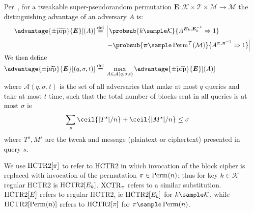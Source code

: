 \documentclass[hctr.tex]{subfiles}
\begin{document}
Per~\cite{cmc}, for a tweakable super-pseudorandom permutation
$\bm{E} : \mathcal{K} \times \mathcal{T} \times \mathcal{M} \rightarrow \mathcal{M}$
the distinguishing advantage of an adversary $A$ is:
%
\begin{align*}
    \advantage{\pm \widetilde{\mathrm{prp}}}{\bm{E}}[(A)] \defeq
    {}&\left\lvert\probsub{k \sample \mathcal{K}}{A^{\bm{E}_k,\bm{E}_k^{-1}}\Rightarrow 1}\right.
    \\
    {}&\left. - \probsub{\bm{\pi} \sample \Perm^\mathcal{T}(\mathcal{M})}
        {A^{\bm{\pi},\bm{\pi}^{-1}}\Rightarrow 1}\right\rvert
    \\
    \intertext{We then define}
    \advantage{\pm \widetilde{\mathrm{prp}}}{\bm{E}}[(q, \sigma, t)]
    \defeq {}&
    \max_{A \in \mathcal{A}(q, \sigma, t)} \advantage{\pm \widetilde{\mathrm{prp}}}{\bm{E}}[(A)]
\end{align*}
where \(\mathcal{A}(q, \sigma, t)\)
is the set of all adversaries 
that make at most \(q\) queries
and take at most \(t\) time,
such that the total number of blocks sent in all queries is
at most \(\sigma\) ie
\begin{displaymath}
    \sum_s \ceil{|T^s|/n} + \ceil{|M^s|/n} \leq \sigma
\end{displaymath}
where \(T^s, M^s\) are the tweak and message
(plaintext or ciphertext)
presented in query \(s\).

We use \(\operatorname{HCTR2}[\pi]\) to refer to HCTR2 in which invocation
of the block cipher is replaced with invocation of the
permutation \(\pi \in \operatorname{Perm}(n)\); thus for key
\(k \in \mathcal{K}\) regular HCTR2 is \(\operatorname{HCTR2}[E_k]\).
\(\operatorname{XCTR}_\pi\) refers to a similar substitution.
\(\operatorname{HCTR2}[E]\) refers to regular HCTR2,
ie \(\operatorname{HCTR2}[E_k]\) for \(k \sample \mathcal{K}\), while
\(\operatorname{HCTR2}[\operatorname{Perm}(n)]\) refers to \(\operatorname{HCTR2}[\pi]\)
for \(\pi \sample \Perm(n)\).
\end{document}
